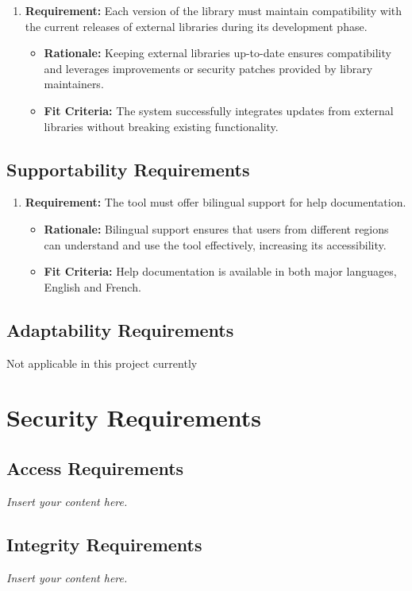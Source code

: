 \documentclass[12pt]{article}
\newcommand{\lips}{\textit{Insert your content here.}}
\begin{document}
\begin{enumerate}
  \item \textbf{Requirement:} Each version of the library must maintain compatibility with the current releases of external libraries during its development phase.
     \begin{itemize}
         \item \textbf{Rationale:} Keeping external libraries up-to-date ensures compatibility and leverages improvements or security patches provided by library maintainers.
         \item \textbf{Fit Criteria:} The system successfully integrates updates from external libraries without breaking existing functionality.
     \end{itemize}
  
  \end{enumerate}

\subsection{Supportability Requirements}
\begin{enumerate}
  \item \textbf{Requirement:} The tool must offer bilingual support for help documentation.
  \begin{itemize}
      \item \textbf{Rationale:} Bilingual support ensures that users from different regions can understand and use the tool effectively, increasing its accessibility.
      \item \textbf{Fit Criteria:} Help documentation is available in both major languages, English and French.
  \end{itemize}
  
\end{enumerate}

\subsection{Adaptability Requirements}
Not applicable in this project currently

\section{Security Requirements}
\subsection{Access Requirements}
\lips
\subsection{Integrity Requirements}
\lips
\end{document}

